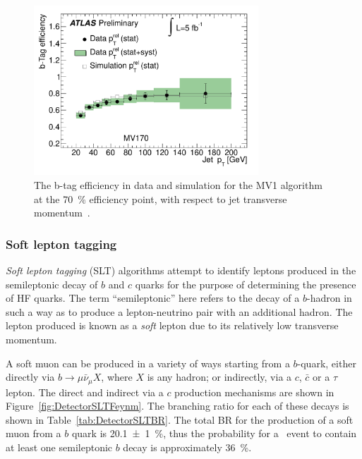 \begin{figure}[htbp]
  \centering
  \includegraphics[width=0.75\textwidth]{PartDetector/Plots/MV1TaggerEff.pdf}
  \caption[The b-tag efficiency in data and simulation for the MV1 algorithm at the \SI{70}{\percent} efficiency point, with respect to jet transverse momentum.]{The b-tag efficiency in data and simulation for the MV1 algorithm at the \SI{70}{\percent} efficiency point, with respect to jet transverse momentum~\cite{Detector:MV1TaggerEffs}.}
  \label{fig:DetectorMV1Perf}
\end{figure}

\subsubsection{Soft lepton tagging} \label{sec:DetectorSLT}

\emph{Soft lepton tagging} (SLT) algorithms attempt to identify leptons produced in the semileptonic decay of $b$ and $c$ quarks for the purpose of determining the presence of HF quarks. The term ``semileptonic'' here refers to the decay of a $b$-hadron in such a way as to produce a lepton-neutrino pair with an additional hadron. The lepton produced is known as a \emph{soft} lepton due to its relatively low transverse momentum.

A soft muon can be produced in a variety of ways starting from a $b$-quark, either directly via $b\rightarrow \mu\bar{\nu}_{\mu}X$, where $X$ is any hadron; or indirectly, via a $c$, $\bar{c}$ or a $\tau$ lepton. The direct and indirect via a $c$ production mechanisms are shown in Figure~\ref{fig:DetectorSLTFeynm}. The branching ratio for each of these decays is shown in Table~\ref{tab:DetectorSLTBR}. The total BR for the production of a soft muon from a $b$ quark is \SI[multi-part-units=single]{20.1(10)}{\percent}, thus the probability for a \ttbar\ event to contain at least one semileptonic $b$ decay is approximately \SI{36}{\percent}.

